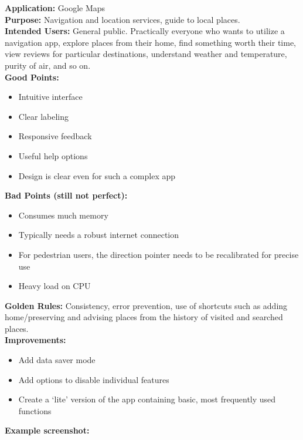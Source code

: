 \documentclass[12pt,a4paper]{article}
\begin{document}
\textbf{Application:} Google Maps
\vspace{0.25cm} \\
\textbf{Purpose:} Navigation and location services, guide to local places.
\vspace{0.25cm} \\
\textbf{Intended Users:} General public. Practically everyone who wants to utilize a navigation app, explore places from their home, find something worth their time, view reviews for particular destinations, understand weather and temperature, purity of air, and so on.
\vspace{0.25cm} \\
\textbf{Good Points:} 
\begin{itemize}
    \item Intuitive interface
    \item Clear labeling
    \item Responsive feedback
    \item Useful help options
    \item Design is clear even for such a complex app
\end{itemize}
\textbf{Bad Points (still not perfect):}
\begin{itemize}
    \item Consumes much memory
    \item Typically needs a robust internet connection
    \item For pedestrian users, the direction pointer needs to be recalibrated for precise use
    \item Heavy load on CPU
\end{itemize}
\textbf{Golden Rules:} Consistency, error prevention, use of shortcuts such as adding home/preserving and advising places from the history of visited and searched places.
\vspace{0.25cm} \\
\textbf{Improvements:}
\begin{itemize}
    \item Add data saver mode
    \item Add options to disable individual features
    \item Create a ‘lite’ version of the app containing basic, most frequently used functions
\end{itemize}
\vspace{0.25cm}
\textbf{Example screenshot:} \\ 
\end{document}
